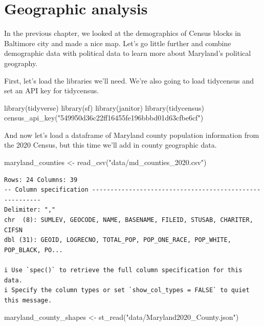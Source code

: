\documentclass[
  letterpaper,
  DIV=11,
  numbers=noendperiod]{scrreprt}
\newenvironment{Shaded}{\begin{snugshade}}{\end{snugshade}}
\newcommand{\FunctionTok}[1]{\textcolor[rgb]{0.28,0.35,0.67}{#1}}
\newcommand{\NormalTok}[1]{\textcolor[rgb]{0.00,0.23,0.31}{#1}}
\newcommand{\OtherTok}[1]{\textcolor[rgb]{0.00,0.23,0.31}{#1}}
\newcommand{\StringTok}[1]{\textcolor[rgb]{0.13,0.47,0.30}{#1}}
\begin{document}

\hypertarget{geographic-analysis}{%
\chapter{Geographic analysis}\label{geographic-analysis}}

In the previous chapter, we looked at the demographics of Census blocks
in Baltimore city and made a nice map. Let's go little further and
combine demographic data with political data to learn more about
Maryland's political geography.

First, let's load the libraries we'll need. We're also going to load
tidycensus and set an API key for tidycensus.

\begin{Shaded}
\begin{Highlighting}[]
\FunctionTok{library}\NormalTok{(tidyverse)}
\FunctionTok{library}\NormalTok{(sf)}
\FunctionTok{library}\NormalTok{(janitor)}
\FunctionTok{library}\NormalTok{(tidycensus)}
\FunctionTok{census\_api\_key}\NormalTok{(}\StringTok{"549950d36c22ff16455fe196bbbd01d63cfbe6cf"}\NormalTok{)}
\end{Highlighting}
\end{Shaded}

And now let's load a dataframe of Maryland county population information
from the 2020 Census, but this time we'll add in county geographic data.

\begin{Shaded}
\begin{Highlighting}[]
\NormalTok{maryland\_counties }\OtherTok{\textless{}{-}} \FunctionTok{read\_csv}\NormalTok{(}\StringTok{"data/md\_counties\_2020.csv"}\NormalTok{)}
\end{Highlighting}
\end{Shaded}

\begin{verbatim}
Rows: 24 Columns: 39
-- Column specification --------------------------------------------------------
Delimiter: ","
chr  (8): SUMLEV, GEOCODE, NAME, BASENAME, FILEID, STUSAB, CHARITER, CIFSN
dbl (31): GEOID, LOGRECNO, TOTAL_POP, POP_ONE_RACE, POP_WHITE, POP_BLACK, PO...

i Use `spec()` to retrieve the full column specification for this data.
i Specify the column types or set `show_col_types = FALSE` to quiet this message.
\end{verbatim}

\begin{Shaded}
\begin{Highlighting}[]
\NormalTok{maryland\_county\_shapes }\OtherTok{\textless{}{-}} \FunctionTok{st\_read}\NormalTok{(}\StringTok{"data/Maryland2020\_County.json"}\NormalTok{)}
\end{Highlighting}
\end{Shaded}
\end{document}

